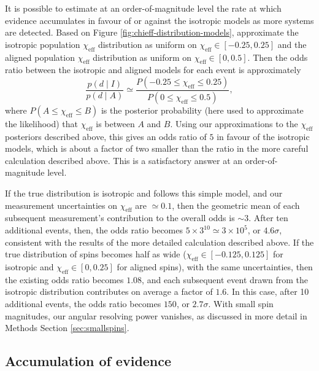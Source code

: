 \documentclass{nature}
\newcommand{\chieff}{\chi_\mathrm{eff}}
\begin{document}
\begin{methods}
It is possible to estimate at an order-of-magnitude level the rate at
which evidence accumulates in favour of or against the isotropic
models as more systems are detected.  Based on Figure
\ref{fig:chieff-distribution-models}, approximate the isotropic
population $\chieff$ distribution as uniform on
$\chieff \in \left[ -0.25, 0.25 \right]$ and the aligned population
$\chieff$ distribution as uniform on
$\chieff \in \left[0, 0.5\right]$.  Then the odds ratio between the
isotropic and aligned models for each event is approximately
\begin{equation}
  \label{eq:approx-odds}
  \frac{p\left( d \mid I \right)}{p\left( d \mid A \right)} \simeq
  \frac{P\left( -0.25 \leq \chieff \leq 0.25 \right)}{P\left( 0 \leq \chieff \leq 0.5 \right) },
\end{equation}
where $P\left( A \leq \chieff \leq B \right)$ is the posterior
probability (here used to approximate the likelihood) that $\chieff$
is between $A$ and $B$.  Using our approximations to the $\chieff$
posteriors described above, this gives an odds ratio of $5$ in favour
of the isotropic models, which is about a factor of two smaller than
the ratio in the more careful calculation described above.  This is a
satisfactory answer at an order-of-magnitude level.

If the true distribution is isotropic and follows this simple model,
and our measurement uncertainties on $\chieff$ are $\simeq 0.1$, then
the geometric mean of each subsequent measurement's contribution to
the overall odds is $\sim 3$.  After ten additional events, then, the
odds ratio becomes $5 \times 3^{10} \simeq 3 \times 10^{5}$, or
$4.6 \sigma$, consistent with the results of the more detailed
calculation described above.  If the true distribution of spins
becomes half as wide ($\chieff \in [-0.125, 0.125]$ for isotropic and
$\chieff \in [0, 0.25]$ for aligned spins), with the same
uncertainties, then the existing odds ratio becomes $1.08$, and each
subsequent event drawn from the isotropic distribution contributes on
average a factor of $1.6$.  In this case, after 10 additional events,
the odds ratio becomes $150$, or $2.7\sigma$.  With small spin
magnitudes, our angular resolving power vanishes, as discussed in more
detail in Methods Section \ref{sec:smallspins}.

\subsection{Accumulation of evidence}


\end{methods}
\end{document}
